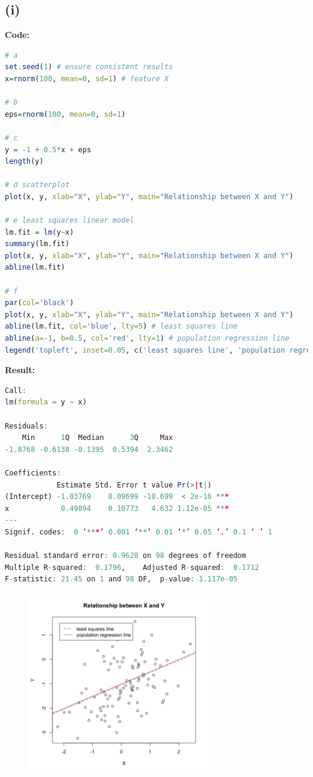 \documentclass[twoside]{homework}
\begin{document}
\subsection*{(i)}
\textbf{Code:}
\begin{lstlisting}[language=R]
# a
set.seed(1) # ensure consistent results
x=rnorm(100, mean=0, sd=1) # feature X

# b
eps=rnorm(100, mean=0, sd=1)

# c
y = -1 + 0.5*x + eps
length(y)

# d scatterplot
plot(x, y, xlab="X", ylab="Y", main="Relationship between X and Y")

# e least squares linear model
lm.fit = lm(y~x)
summary(lm.fit)
plot(x, y, xlab="X", ylab="Y", main="Relationship between X and Y")
abline(lm.fit)

# f 
par(col='black')
plot(x, y, xlab="X", ylab="Y", main="Relationship between X and Y")
abline(lm.fit, col='blue', lty=5) # least squares line
abline(a=-1, b=0.5, col='red', lty=1) # population regression line
legend('topleft', inset=0.05, c('least squares line', 'population regression line'), lty=c(5, 1), col=c('blue', 'red'), bty = "o")
\end{lstlisting}
\textbf{Result:}
\begin{lstlisting}[language=R]
Call:
lm(formula = y ~ x)

Residuals:
    Min      1Q  Median      3Q     Max 
-1.8768 -0.6138 -0.1395  0.5394  2.3462 

Coefficients:
            Estimate Std. Error t value Pr(>|t|)    
(Intercept) -1.03769    0.09699 -10.699  < 2e-16 ***
x            0.49894    0.10773   4.632 1.12e-05 ***
---
Signif. codes:  0 ‘***’ 0.001 ‘**’ 0.01 ‘*’ 0.05 ‘.’ 0.1 ‘ ’ 1

Residual standard error: 0.9628 on 98 degrees of freedom
Multiple R-squared:  0.1796,	Adjusted R-squared:  0.1712 
F-statistic: 21.45 on 1 and 98 DF,  p-value: 1.117e-05
\end{lstlisting}
\begin{figure}[htb]
\begin{center}
\includegraphics[width=0.7\textwidth]{HW1_P3_i.png}
\end{center}
\label{fig:HW1_P3_i}
\end{figure}
\end{document}
